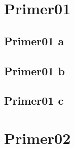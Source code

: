 \documentclass[12pt]{article}
\begin{document}
\tableofcontents

\section{Primer01}
\subsection{Primer01 a}
\subsection{Primer01 b}
\subsection{Primer01 c}
\section{Primer02}
\end{document}
